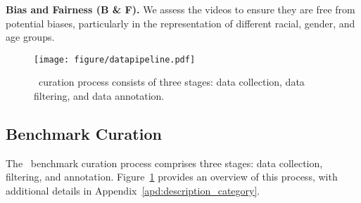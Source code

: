 \noindent \textbf{Bias and Fairness (B \& F).} We assess the videos to ensure they are free from potential biases, particularly in the representation of different racial, gender, and age groups. 

















\begin{figure}[tb]
    \centering
    \texttt{[image: figure/datapipeline.pdf]}
    \vspace{-0.5em}
    \caption{\datasetname\ curation process consists of three stages: data collection, data filtering, and data annotation.}
    \label{fig:datapipeline}
    \vspace{-1.5em}
\end{figure}


\vspace{-0.3em}
\subsection{Benchmark Curation}
\vspace{-0.3em}
The \datasetname\ benchmark curation process comprises three stages: data collection, filtering, and annotation. Figure~\ref{fig:datapipeline} provides an overview of this process, with additional details in Appendix~\ref{apd:description_category}.
\vspace{-0.3em}
